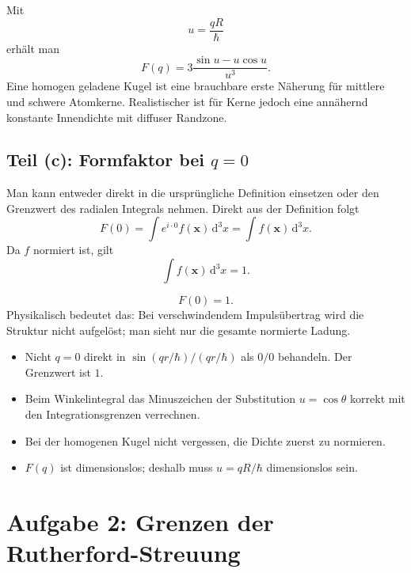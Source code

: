 \documentclass[11pt,a4paper]{scrartcl}
\newcommand{\dd}{\,\mathrm{d}}
\newcommand{\vect}[1]{\bm{#1}}
\begin{document}
\begin{answerbox}
Mit
\[
    \boxed{u=\frac{qR}{\hbar}}
\]
erh\"alt man
\[
    \boxed{F(q)=3\frac{\sin u-u\cos u}{u^3}.}
\]
Eine homogen geladene Kugel ist eine brauchbare erste N\"aherung f\"ur mittlere und schwere Atomkerne. Realistischer ist f\"ur Kerne jedoch eine ann\"ahernd konstante Innendichte mit diffuser Randzone.
\end{answerbox}

\subsection{Teil (c): Formfaktor bei $q=0$}

\begin{solutionbox}
Man kann entweder direkt in die urspr\"ungliche Definition einsetzen oder den Grenzwert des radialen Integrals nehmen. Direkt aus der Definition folgt
\[
    F(0)=\int e^{i\cdot 0}f(\vect{x})\dd^3x
    =\int f(\vect{x})\dd^3x.
\]
Da $f$ normiert ist, gilt
\[
    \int f(\vect{x})\dd^3x=1.
\]
\end{solutionbox}

\begin{answerbox}
\[
    \boxed{F(0)=1.}
\]
Physikalisch bedeutet das: Bei verschwindendem Impuls\"ubertrag wird die Struktur nicht aufgel\"ost; man sieht nur die gesamte normierte Ladung.
\end{answerbox}

\begin{warningbox}[title=Typische Fehler bei Aufgabe 1]
\begin{itemize}
    \item Nicht $q=0$ direkt in $\sin(qr/\hbar)/(qr/\hbar)$ als $0/0$ behandeln. Der Grenzwert ist $1$.
    \item Beim Winkelintegral das Minuszeichen der Substitution $u=\cos\theta$ korrekt mit den Integrationsgrenzen verrechnen.
    \item Bei der homogenen Kugel nicht vergessen, die Dichte zuerst zu normieren.
    \item $F(q)$ ist dimensionslos; deshalb muss $u=qR/\hbar$ dimensionslos sein.
\end{itemize}
\end{warningbox}

\FloatBarrier
\newpage

\section{Aufgabe 2: Grenzen der Rutherford-Streuung}
\end{document}
